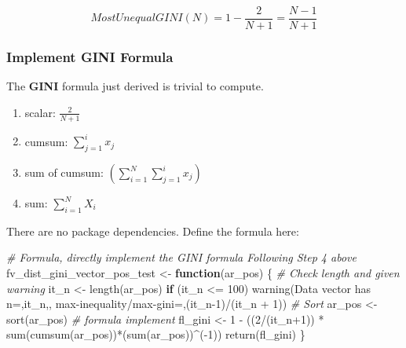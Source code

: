 \documentclass[
]{book}
\newenvironment{Shaded}{\begin{snugshade}}{\end{snugshade}}
\newcommand{\CommentTok}[1]{\textcolor[rgb]{0.56,0.35,0.01}{\textit{#1}}}
\newcommand{\ControlFlowTok}[1]{\textcolor[rgb]{0.13,0.29,0.53}{\textbf{#1}}}
\newcommand{\DecValTok}[1]{\textcolor[rgb]{0.00,0.00,0.81}{#1}}
\newcommand{\FunctionTok}[1]{\textcolor[rgb]{0.00,0.00,0.00}{#1}}
\newcommand{\NormalTok}[1]{#1}
\newcommand{\OtherTok}[1]{\textcolor[rgb]{0.56,0.35,0.01}{#1}}
\newcommand{\SpecialCharTok}[1]{\textcolor[rgb]{0.00,0.00,0.00}{#1}}
\newcommand{\StringTok}[1]{\textcolor[rgb]{0.31,0.60,0.02}{#1}}
\providecommand{\tightlist}{%
  \setlength{\itemsep}{0pt}\setlength{\parskip}{0pt}}
\begin{document}
\[
 MostUnequalGINI\left(N\right) = 1 - \frac{2}{N+1} = \frac{N-1}{N+1}
\]

\hypertarget{implement-gini-formula}{%
\subsubsection{Implement GINI Formula}\label{implement-gini-formula}}

The \textbf{GINI} formula just derived is trivial to compute.

\begin{enumerate}
\def\labelenumi{\arabic{enumi}.}
\tightlist
\item
  scalar: \(\frac{2}{N+1}\)
\item
  cumsum: \(\sum_{j=1}^{i} x_j\)
\item
  sum of cumsum: \(\left(\sum_{i=1}^N \sum_{j=1}^{i} x_j\right)\)
\item
  sum: \(\sum_{i=1}^N X_i\)
\end{enumerate}

There are no package dependencies. Define the formula here:

\begin{Shaded}
\begin{Highlighting}[]
\CommentTok{\# Formula, directly implement the GINI formula Following Step 4 above}
\NormalTok{fv\_dist\_gini\_vector\_pos\_test }\OtherTok{\textless{}{-}} \ControlFlowTok{function}\NormalTok{(ar\_pos) \{}
  \CommentTok{\# Check length and given warning}
\NormalTok{  it\_n }\OtherTok{\textless{}{-}} \FunctionTok{length}\NormalTok{(ar\_pos)}
  \ControlFlowTok{if}\NormalTok{ (it\_n }\SpecialCharTok{\textless{}=} \DecValTok{100}\NormalTok{)  }\FunctionTok{warning}\NormalTok{(}\StringTok{\textquotesingle{}Data vector has n=\textquotesingle{}}\NormalTok{,it\_n,}\StringTok{\textquotesingle{}, max{-}inequality/max{-}gini=\textquotesingle{}}\NormalTok{,(it\_n}\DecValTok{{-}1}\NormalTok{)}\SpecialCharTok{/}\NormalTok{(it\_n }\SpecialCharTok{+} \DecValTok{1}\NormalTok{))}
  \CommentTok{\# Sort}
\NormalTok{  ar\_pos }\OtherTok{\textless{}{-}} \FunctionTok{sort}\NormalTok{(ar\_pos)}
  \CommentTok{\# formula implement}
\NormalTok{  fl\_gini }\OtherTok{\textless{}{-}} \DecValTok{1} \SpecialCharTok{{-}}\NormalTok{ ((}\DecValTok{2}\SpecialCharTok{/}\NormalTok{(it\_n}\SpecialCharTok{+}\DecValTok{1}\NormalTok{)) }\SpecialCharTok{*} \FunctionTok{sum}\NormalTok{(}\FunctionTok{cumsum}\NormalTok{(ar\_pos))}\SpecialCharTok{*}\NormalTok{(}\FunctionTok{sum}\NormalTok{(ar\_pos))}\SpecialCharTok{\^{}}\NormalTok{(}\SpecialCharTok{{-}}\DecValTok{1}\NormalTok{))}
  \FunctionTok{return}\NormalTok{(fl\_gini)}
\NormalTok{\}}
\end{Highlighting}
\end{Shaded}
\end{document}

